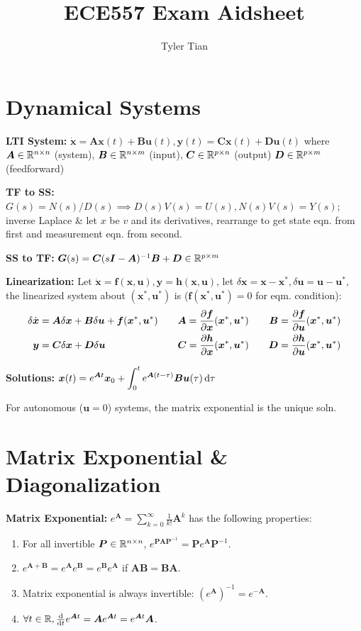 \documentclass[twocolumn, 8pt]{extarticle}
\title{ECE557 Exam Aidsheet}
\author{Tyler Tian}
\begin{document}
\section{Dynamical Systems}

\textbf{LTI System:} \(\dot{\bm x} = \bm A\bm x(t) + \bm B\bm u(t), \bm y(t) = \bm C\bm x(t) + \bm D\bm u(t)\)
where \(\bm A \in \mathbb{R}^{n \times n}\) (system), \(\bm B \in \mathbb{R}^{n \times m}\) (input), \(\bm C \in \mathbb{R}^{p
\times n}\) (output) \(\bm D \in \mathbb{R}^{p \times m}\) (feedforward)

\textbf{TF to SS:} \(G(s) = N(s)/D(s) \implies D(s)V(s) = U(s), N(s)V(s) = Y(s)\); inverse
Laplace \& let \(x\) be \(v\) and its derivatives, rearrange to get state eqn. from first and measurement eqn. from
second.

\textbf{SS to TF:} \(\bm G(s) = \bm C(s\bm I - \bm A)^{-1}\bm B + \bm D \in \mathbb{R}^{p \times m}\)

\textbf{Linearization:} Let \(\dot{\bm x} = \bm f(\bm x, \bm u), \bm y = \bm h(\bm x, \bm u)\), let \(\delta\bm x = \bm
x - \bm x^*, \delta\bm u = \bm u - \bm u^*\), the linearized system about \((\bm x^*, \bm u^*)\) is (\(\bm f(\bm x^*,
\bm u^*) = 0\) for eqm. condition):
\begin{align*}
    \delta\dot{\bm x} &= \bm A\delta\bm x + \bm B\delta\bm u + \bm f(\bm x^*, \bm u^*) &&\quad \bm A = \frac{\partial\bm f}{\partial\bm x}(\bm x^*, \bm u^*) &\quad \bm B = \frac{\partial\bm f}{\partial\bm u}(\bm x^*, \bm u^*) \\
    \bm y &= \bm C\delta\bm x + \bm D\delta\bm u &&\quad \bm C = \frac{\partial\bm h}{\partial\bm x}(\bm x^*, \bm u^*) &\quad \bm D = \frac{\partial\bm h}{\partial\bm u}(\bm x^*, \bm u^*)
\end{align*}

\textbf{Solutions:} \(\displaystyle \bm x(t) = e^{\bm At}\bm x_0 + \int _0^t e^{\bm A(t - \tau)}\bm B\bm u(\tau)\,\mathrm{d}\tau\)

For autonomous (\(\bm u = 0\)) systems, the matrix exponential is the unique soln.

\section{Matrix Exponential \& Diagonalization}

\textbf{Matrix Exponential:} \(e^{\bm A} = \sum _{k = 0}^\infty \frac{1}{k!}\bm A^k\) has the following properties:
\begin{enumerate}
    \item For all invertible \(\bm P \in \mathbb{R}^{n \times n}\), \(e^{\bm P\bm A\bm P^{-1}} = \bm Pe^{\bm A}\bm P^{-1}\).
    \item \(e^{\bm A + \bm B} = e^{\bm A}e^{\bm B} = e^{\bm B}e^{\bm A}\) if \(\bm A\bm B = \bm B\bm A\).
    \item Matrix exponential is always invertible: \((e^{\bm A})^{-1} = e^{-\bm A}\).
    \item \(\forall t \in \mathbb{R}, \frac{\mathrm{d}}{\mathrm{d}t}e^{\bm At} = \bm Ae^{\bm At} = e^{\bm At}\bm A\).
\end{enumerate}
\end{document}
